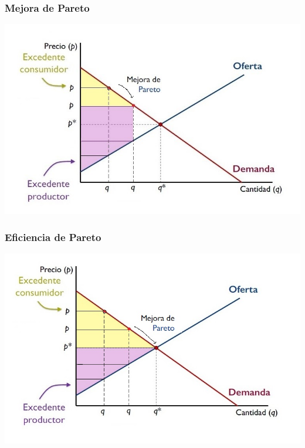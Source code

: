 \documentclass{beamer}
\begin{document}
\begin{frame}
\frametitle{Mejora de Pareto}
\includegraphics[scale=0.6]{../Figures/Tema_07.23_newexcedentes2.jpg}
\end{frame}

\begin{frame}
\frametitle{Eficiencia de Pareto}
\includegraphics[scale=0.6]{../Figures/Tema_07.23_newexcedentes3.jpg}
\end{frame}
\end{document}
